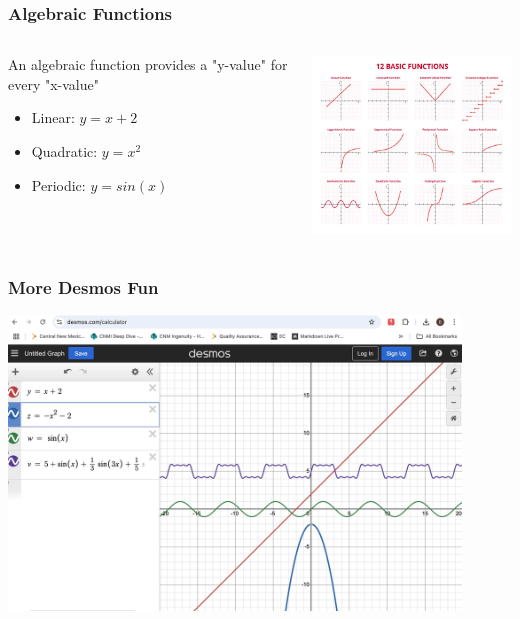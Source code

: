 \documentclass{beamer}
\begin{document}
\begin{frame}\frametitle{Algebraic Functions}
\begin{columns}
\begin{column}{4.5cm}
An algebraic function provides a "y-value" for every "x-value"
\begin{itemize}
\item Linear: $y = x + 2$
\item Quadratic: $y = x^2$
\item Periodic: $y = sin(x)$
\end{itemize}
\end{column}
\begin{column}{7cm}
\begin{center}
\includegraphics[width=7cm]{fig/basicfun.jpg}
\end{center}
\end{column}
\end{columns}
\end{frame}

\begin{frame}\frametitle{More Desmos Fun}

\begin{center}
\includegraphics[width=12cm]{fig/desmosfun.jpg}
\end{center}
\end{frame}
\end{document}
